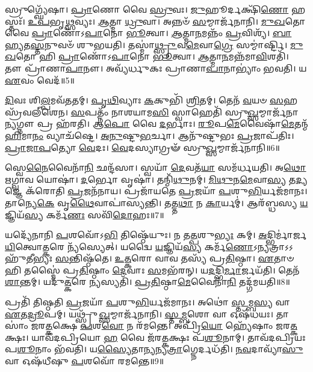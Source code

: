 𑌸𑍍𑌰𑍁𑌗𑍍𑌘𑍍𑌯𑍇᳴𑌷𑌾।
\-\ul{𑌪𑍍𑌰𑌾}\-𑌣𑍋 𑌵𑍈 \ul{𑌸𑍍𑌰𑍁}\-𑌵𑌃।
\-\ul{𑌜𑍁}\-𑌹𑍂𑌰𑍍𑌦𑌕𑍍𑌷𑌿᳴\-\ul{𑌣𑍋} 𑌹𑌸𑍍𑌤𑌃᳴।
\-\ul{𑌉}\-\-\ul{𑌪}\-𑌭𑍃\-\ul{𑌥𑍍𑌸}\-𑌵𑍍𑌯𑌃।
\-\ul{𑌆}\-𑌤𑍍𑌮𑌾 \ul{𑌧𑍍𑌰𑍁}\-𑌵𑌾।
𑌅𑌨𑍍𑌨𑍞᳴ \ul{𑌸}\-𑌮𑍍𑌮𑌾𑌰𑍍𑌜᳴𑌨𑌾𑌨𑌿।
\-\ul{𑌮𑍁}\-\-\ul{𑌖}\-𑌤𑍋 𑌵𑍈 \ul{𑌪𑍍𑌰𑌾}\-𑌣𑍋᳴\-𑌽\-\ul{𑌪𑌾}\-𑌨𑍋 \ul{𑌭𑍂}\-𑌤𑍍𑌵𑌾।
\-\ul{𑌆}\-𑌤𑍍𑌮𑌾\-\ul{𑌨}\-𑌮𑌨𑍍𑌨𑌂᳴ \ul{𑌪𑍍𑌰}\-𑌵𑌿𑌶𑍍𑌯᳴।
\-\ul{𑌬𑌾}\-\-\ul{𑌹𑍍𑌯}\-𑌤\-\ul{𑌸𑍍𑌤}\-𑌨𑍁𑌵𑍞᳴ 𑌶𑍁𑌭𑌯𑌤𑌿।
𑌤𑌸𑍍𑌮𑌾॑\-\ul{𑌥𑍍𑌸𑍍𑌰𑍁}\-𑌵\-\ul{𑌮𑍇}\-𑌵𑌾\-\ul{𑌗𑍍𑌰𑍇} 𑌸𑌮𑍍𑌮𑌾॑𑌰𑍍𑌷𑍍𑌟𑌿।
\-\ul{𑌮𑍁}\-\-\ul{𑌖}\-𑌤𑍋 𑌹𑌿 \ul{𑌪𑍍𑌰𑌾}\-𑌣𑍋᳴\-𑌽\-\ul{𑌪𑌾}\-𑌨𑍋 \ul{𑌭𑍂}\-𑌤𑍍𑌵𑌾।
\-\ul{𑌆}\-𑌤𑍍𑌮𑌾\-\ul{𑌨}\-𑌮𑌨𑍍𑌨᳴𑌮𑌾\-\ul{𑌵𑌿}\-𑌶𑌤𑌿᳴।
𑌤𑍗 𑌪𑍍𑌰𑌾᳴𑌣𑌾\-\ul{𑌪𑌾}\-𑌨𑍗।
𑌅𑌵𑍍𑌯᳴𑌰𑍍𑌧𑍁𑌕𑌃 𑌪𑍍𑌰𑌾𑌣𑌾\-\ul{𑌪𑌾}\-𑌨𑌾𑌭𑍍𑌯𑌾𑌂॑ 𑌭𑌵𑌤𑌿।
𑌯 \ul{𑌏}\-𑌵𑌂 𑌵𑍇𑌦᳴॥5॥\anuvakamend[\-\ul{𑌜𑍁}\-𑌹𑍂𑌰𑍍𑌮𑍃᳴𑌜𑍍𑌯𑌾𑌦𑍍𑌭\-\ul{𑌵}\-𑌤𑍀𑌤𑌿᳴ \ul{𑌪𑍍𑌰}\-𑌤𑍍𑌯\-\ul{𑌞𑍍𑌚𑍍𑌯}\-𑌧𑌸𑍍𑌤𑌾॑𑌨𑍍𑌮𑌾\-\ul{𑌰𑍍𑌷𑍍𑌟𑌿} 𑌪𑌞𑍍𑌚᳴ 𑌚]

\-\ul{𑌦𑌿}\-𑌵𑌃 𑌶𑌿\-\ul{𑌲𑍍𑌪}\-𑌮𑌵᳴𑌤𑌤𑌮𑍍।
\-\ul{𑌪𑍃}\-\-\ul{𑌥𑌿}\-𑌵𑍍𑌯𑌾𑌃 \ul{𑌕}\-𑌕𑍁𑌭𑌿᳴ \ul{𑌶𑍍𑌰𑌿}\-𑌤𑌮𑍍।
𑌤𑍇𑌨᳴ \ul{𑌵}\-𑌯𑍞 \ul{𑌸}\-𑌹𑌸𑍍𑌰᳴𑌵𑌲𑍍‌𑌶𑍇𑌨।
\-\ul{𑌸}\-𑌪𑌤𑍍𑌨𑌂᳴ 𑌨𑌾𑌶𑌯𑌾𑌮\-\ul{𑌸𑌿} 𑌸𑍍𑌵𑌾𑌹𑍇𑌤𑌿᳴ 𑌸𑍍𑌰𑍁\-\ul{𑌖𑍍𑌸}\-𑌮𑍍𑌮𑌾𑌰𑍍𑌜᳴𑌨𑌾\-\ul{𑌨𑍍𑌯}\-𑌗𑍍𑌨𑍗 𑌪𑍍𑌰 𑌹᳴𑌰𑌤𑌿।
𑌆\-\ul{𑌪𑍋} 𑌵𑍈 \ul{𑌦}\-𑌰𑍍𑌭𑌾𑌃।
\-\ul{𑌰𑍂}\-𑌪\-\ul{𑌮𑍇}\-𑌵𑍈𑌷𑌾᳴\-\ul{𑌮𑍇}\-𑌤𑌨𑍍𑌮᳴\-\ul{𑌹𑌿}\-𑌮𑌾\-\ul{𑌨𑌂} 𑌵𑍍𑌯𑌾𑌚᳴𑌷𑍍𑌟𑍇।
\-\ul{𑌅}\-\-\ul{𑌨𑍁}\-𑌷𑍍𑌟𑍁\-\ul{𑌭}\-𑌰𑍍𑌚𑌾।
𑌆𑌨𑍁᳴𑌷𑍍𑌟𑍁𑌭𑌃 \ul{𑌪𑍍𑌰}\-𑌜𑌾\-𑌪᳴𑌤𑌿𑌃।
\-\ul{𑌪𑍍𑌰𑌾}\-\-\ul{𑌜𑌾}\-\-\ul{𑌪}\-𑌤𑍍𑌯𑍋 \ul{𑌵𑍇}\-𑌦𑌃।
\-\ul{𑌵𑍇}\-𑌦𑌸𑍍𑌯𑌾𑌗𑍍𑌰𑍟᳴ 𑌸𑍍𑌰𑍁\-\ul{𑌖𑍍𑌸}\-𑌮𑍍𑌮𑌾𑌰𑍍𑌜᳴𑌨𑌾𑌨𑌿॥6॥

𑌸𑍍𑌵𑍇\-\ul{𑌨𑍈}\-𑌵𑍈𑌨𑌾᳴\-\ul{𑌨𑌿} 𑌛𑌨𑍍𑌦᳴𑌸𑌾।
𑌸𑍍𑌵𑌯𑌾᳴ \ul{𑌦𑍇}\-𑌵𑌤᳴\-\ul{𑌯𑌾} 𑌸𑌮᳴𑌰𑍍𑌧𑌯𑌤𑌿।
𑌅\-\ul{𑌥𑍋} 𑌋𑌗𑍍𑌵𑌾𑌵 𑌯𑍋𑌷𑌾॑।
\-\ul{𑌦}\-𑌰𑍍𑌭𑍋 𑌵𑍃𑌷𑌾॑।
𑌤𑌨𑍍𑌮𑌿᳴\-\ul{𑌥𑍁}\-𑌨𑌮𑍍।
\-\ul{𑌮𑌿}\-\-\ul{𑌥𑍁}\-𑌨\-\ul{𑌮𑍇}\-𑌵𑌾\-\ul{𑌸𑍍𑌯} 𑌤\-\ul{𑌦𑍍𑌯}\-𑌜𑍍𑌞𑍇 𑌕᳴𑌰𑍋𑌤𑌿 \ul{𑌪𑍍𑌰}\-𑌜𑌨᳴𑌨𑌾𑌯।
𑌪𑍍𑌰𑌜𑌾᳴𑌯𑌤𑍇 \ul{𑌪𑍍𑌰}\-𑌜𑌯𑌾᳴ \ul{𑌪}\-𑌶𑍁\-\ul{𑌭𑌿}\-𑌰𑍍𑌯𑌜᳴𑌮𑌾𑌨𑌃।
𑌤𑌾𑌨𑍍𑌯𑍇\-\ul{𑌕𑍇} 𑌵𑍃\-\ul{𑌥𑍈}\-𑌵𑌾𑌪𑌾॑𑌸𑍍𑌯𑌨𑍍𑌤𑌿।
𑌤𑌤𑍍𑌤\-\ul{𑌥𑌾} 𑌨 \ul{𑌕𑌾}\-𑌰𑍍𑌯𑌮𑍍॑।
𑌆𑌰᳴𑌬𑍍𑌧𑌸𑍍𑌯 \ul{𑌯}\-𑌜𑍍𑌞𑌿𑌯᳴\-\ul{𑌸𑍍𑌯} 𑌕𑌰𑍍𑌮᳴\-\ul{𑌣𑌃} 𑌸𑌵𑌿᳴\-\ul{𑌦𑍋}\-𑌹𑌃॥7॥

𑌯𑌦𑍍𑌯𑍇᳴𑌨𑌾𑌨𑌿 \ul{𑌪}\-𑌶𑌵𑍋᳴𑌽\-\ul{𑌭𑌿} 𑌤𑌿𑌷𑍍𑌠𑍇᳴𑌯𑍁𑌃।
𑌨 𑌤\-\ul{𑌤𑍍𑌪}\-𑌶𑍁\-\ul{𑌭𑍍𑌯𑌃} 𑌕𑌮𑍍।
\-\ul{𑌅}\-𑌦𑍍𑌭𑌿𑌰𑍍𑌮𑌾॑𑌰𑍍𑌜\-\ul{𑌯𑌿}\-𑌤𑍍𑌵𑍋\-\ul{𑌤𑍍𑌕}\-𑌰𑍇 𑌨𑍍𑌯᳴𑌸𑍍𑌯𑍇𑌤𑍍।
𑌯𑌦𑍍𑌵𑍈 \ul{𑌯}\-𑌜𑍍𑌞𑌿𑌯᳴\-\ul{𑌸𑍍𑌯} 𑌕𑌰𑍍𑌮᳴\-\ul{𑌣𑍋}\-\-𑌽𑌨𑍍𑌯𑌤𑍍𑌰𑌾𑌽𑌽𑌹𑍁᳴𑌤𑍀𑌭𑍍𑌯𑌃 \ul{𑌸}\-𑌨𑍍𑌤𑌿𑌷𑍍𑌠᳴𑌤𑍇।
\-\ul{𑌉}\-\-\ul{𑌤𑍍𑌕}\-𑌰𑍋 𑌵𑌾𑌵 𑌤𑌸𑍍𑌯᳴ 𑌪𑍍𑌰\-\ul{𑌤𑌿}\-𑌷𑍍𑌠𑌾।
\-\ul{𑌏}\-𑌤𑌾𑍞 𑌹𑌿 𑌤𑌸𑍍𑌮𑍈॑ 𑌪𑍍𑌰\-\ul{𑌤𑌿}\-𑌷𑍍𑌠𑌾𑌂 \ul{𑌦𑍇}\-𑌵𑌾𑌃 \ul{𑌸}\-𑌮𑌭᳴𑌰𑌨𑍍।
𑌯\-\ul{𑌦}\-𑌦𑍍𑌭𑌿\-\ul{𑌰𑍍𑌮𑌾}\-𑌰𑍍𑌜𑌯᳴𑌤𑌿।
𑌤𑍇𑌨᳴ \ul{𑌶𑌾}\-𑌨𑍍𑌤𑌮𑍍।
𑌯𑌦𑍁᳴\-\ul{𑌤𑍍𑌕}\-𑌰𑍇 \ul{𑌨𑍍𑌯}\-𑌸𑍍𑌯𑌤𑌿᳴।
\-\ul{𑌪𑍍𑌰}\-\-\ul{𑌤𑌿}\-𑌷𑍍𑌠𑌾\-\ul{𑌮𑍇}\-𑌵𑍈𑌨𑌾᳴\-\ul{𑌨𑌿} 𑌤𑌦𑍍𑌗᳴𑌮𑌯𑌤𑌿॥8॥

𑌪𑍍𑌰𑌤𑌿᳴ 𑌤𑌿𑌷𑍍𑌠𑌤𑌿 \ul{𑌪𑍍𑌰}\-𑌜𑌯𑌾᳴ \ul{𑌪}\-𑌶𑍁\-\ul{𑌭𑌿}\-𑌰𑍍𑌯𑌜᳴𑌮𑌾𑌨𑌃।
𑌅𑌥𑍋॑ \ul{𑌸𑍍𑌤}\-𑌮𑍍𑌬\-\ul{𑌸𑍍𑌯} 𑌵𑌾 \ul{𑌏}\-𑌤\-\ul{𑌦𑍍𑌰𑍂}\-𑌪𑌮𑍍।
𑌯𑌥𑍍𑌸𑍍𑌰𑍁᳴\-\ul{𑌖𑍍𑌸}\-𑌮𑍍𑌮𑌾𑌰𑍍𑌜᳴𑌨𑌾𑌨𑌿।
\-\ul{𑌸𑍍𑌤}\-\-\ul{𑌮𑍍𑌬}\-𑌶𑍋 𑌵𑌾 𑌓𑌷᳴𑌧𑌯𑌃।
𑌤𑌾𑌸𑌾𑌂॑ 𑌜𑌰\-\ul{𑌤𑍍𑌕}\-𑌕𑍍𑌷𑍇 \ul{𑌪}\-𑌶\-\ul{𑌵𑍋} 𑌨 𑌰᳴𑌮𑌨𑍍𑌤𑍇।
𑌅𑌪𑍍𑌰𑌿᳴\-\ul{𑌯𑍋} 𑌹𑍍𑌯𑍇᳴𑌷𑌾𑌂 𑌜𑌰\-\ul{𑌤𑍍𑌕}\-𑌕𑍍𑌷𑌃।
𑌯𑌾𑌵᳴𑌦𑌪𑍍𑌰𑌿𑌯𑍋 \ul{𑌹} 𑌵𑍈 𑌜᳴𑌰\-\ul{𑌤𑍍𑌕}\-𑌕𑍍𑌷𑌃 𑌪᳴\-\ul{𑌶𑍂}\-𑌨𑌾𑌮𑍍।
𑌤𑌾𑌵᳴𑌦𑌪𑍍𑌰𑌿𑌯𑌃 𑌪\-\ul{𑌶𑍂}\-𑌨𑌾𑌂 𑌭᳴𑌵𑌤𑌿।
𑌯\-\ul{𑌸𑍍𑌯𑍈}\-𑌤𑌾\-\ul{𑌨𑍍𑌯}\-𑌨𑍍𑌯\-\ul{𑌤𑍍𑌰𑌾}\-𑌗𑍍𑌨𑍇𑌰𑍍𑌦𑌧᳴𑌤𑌿।
\-\ul{𑌨}\-\-\ul{𑌵}\-𑌦𑌾𑌵𑍍𑌯𑌾᳴\-\ul{𑌸𑍁} 𑌵𑌾 𑌓𑌷᳴𑌧𑍀𑌷𑍁 \ul{𑌪}\-𑌶𑌵𑍋᳴ 𑌰𑌮𑌨𑍍𑌤𑍇॥9॥

